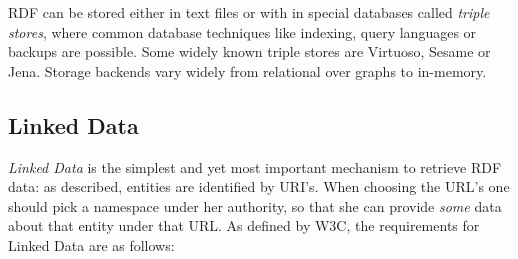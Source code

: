 RDF can be stored either in text files or with in special databases called \textit{triple stores}, where common database techniques like indexing, query languages or backups are possible. 
Some widely known triple stores are Virtuoso, Sesame  or Jena. 
Storage backends vary widely from relational over graphs to in-memory.

\subsection{Linked Data}
\textit{Linked Data} is the simplest and yet most important mechanism to retrieve RDF data: as described, entities are identified by URI's. 
When choosing the URL's one should pick a namespace under her authority, so that she can provide \textit{some} data about that entity under that URL. As defined by W3C, the requirements for Linked Data are as follows:

